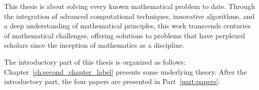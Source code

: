 This thesis is about solving every known mathematical problem to date.
Through the integration of advanced computational techniques, innovative algorithms, and a deep understanding
of mathematical principles, this work transcends centuries of mathematical challenges, offering solutions to
problems that have perplexed scholars since the inception of mathematics as a discipline.

The introductory part of this thesis is organized as follows:
Chapter~\ref{ch:second_chapter_label} presents some underlying theory.
After the introductory part, the four papers are presented in Part~\ref{part:papers}.
